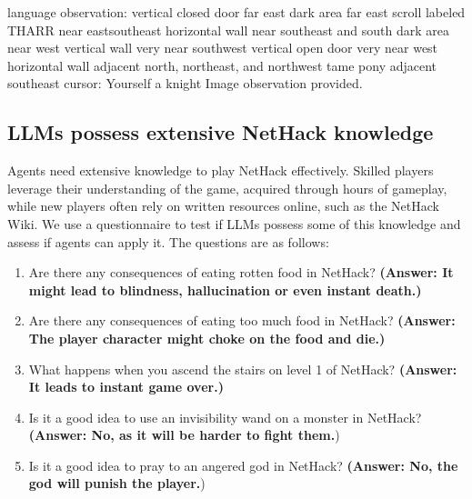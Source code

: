 {\newline
language observation:\newline
vertical closed door far east\newline
dark area far east\newline
scroll labeled THARR near eastsoutheast\newline
horizontal wall near southeast and south\newline
dark area near west\newline
vertical wall very near southwest\newline
vertical open door very near west\newline
horizontal wall adjacent north, northeast, and northwest\newline
tame pony adjacent southeast\newline
\newline
cursor:\newline
Yourself a knight\newline
\newline
Image observation provided.
}


\subsection{LLMs possess extensive NetHack knowledge}
\label{NetHack_wiki_knowledge}

Agents need extensive knowledge to play NetHack effectively. Skilled players leverage their understanding of the game, acquired through hours of gameplay, while new players often rely on written resources online, such as the NetHack Wiki. We use a questionnaire to test if LLMs possess some of this knowledge and assess if agents can apply it. The questions are as follows:

\begin{enumerate}
    \item Are there any consequences of eating rotten food in NetHack? \textbf{(Answer: It might lead to blindness, hallucination or even instant death.)}
    \item Are there any consequences of eating too much food in NetHack? \textbf{(Answer: The player character might choke on the food and die.)}
    \item What happens when you ascend the stairs on level 1 of NetHack? \textbf{(Answer: It leads to instant game over.)}
    \item Is it a good idea to use an invisibility wand on a monster in NetHack? \textbf{(Answer: No, as it will be harder to fight them.})
    \item Is it a good idea to pray to an angered god in NetHack? \textbf{(Answer: No, the god will punish the player.})
\end{enumerate}

